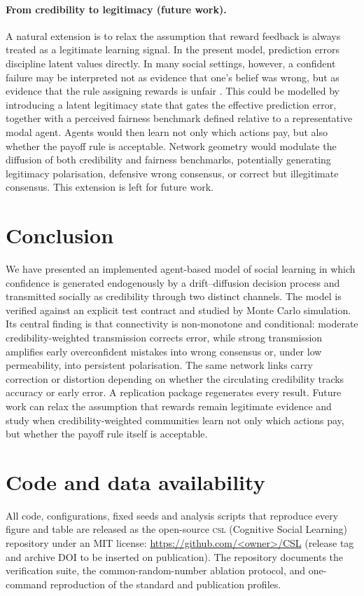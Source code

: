 \documentclass[11pt]{article}
\newcommand{\1}{\mathbf{1}}
\begin{document}
\paragraph{From credibility to legitimacy (future work).}
A natural extension is to relax the assumption that reward feedback is always
treated as a legitimate learning signal. In the present model, prediction errors
discipline latent values directly. In many social settings, however, a confident
failure may be interpreted not as evidence that one's belief was wrong, but as
evidence that the rule assigning rewards is unfair
\citep{Rabin1993Fairness,FehrSchmidt1999,BoltonOckenfels2000}. This could be
modelled by introducing a latent legitimacy state that gates the effective
prediction error, together with a perceived fairness benchmark defined relative
to a representative modal agent. Agents would then learn not only which actions
pay, but also whether the payoff rule is acceptable. Network geometry would
modulate the diffusion of both credibility and fairness benchmarks, potentially
generating legitimacy polarisation, defensive wrong consensus, or correct but
illegitimate consensus. This extension is left for future work.

\section{Conclusion}
We have presented an implemented agent-based model of social learning in which
confidence is generated endogenously by a drift--diffusion decision process and
transmitted socially as credibility through two distinct channels. The model is
verified against an explicit test contract and studied by Monte Carlo
simulation. Its central finding is that connectivity is non-monotone and
conditional: moderate credibility-weighted transmission corrects error, while
strong transmission amplifies early overconfident mistakes into wrong consensus
or, under low permeability, into persistent polarisation. The same network links
carry correction or distortion depending on whether the circulating credibility
tracks accuracy or early error. A replication package regenerates every result.
Future work can relax the assumption that rewards remain legitimate evidence and
study when credibility-weighted communities learn not only which actions pay, but
whether the payoff rule itself is acceptable.

\section*{Code and data availability}
All code, configurations, fixed seeds and analysis scripts that reproduce every
figure and table are released as the open-source \textsc{csl} (Cognitive Social
Learning) repository under an MIT license:
\url{https://github.com/<owner>/CSL} (release tag and archive DOI to be inserted
on publication). The repository documents the verification suite, the
common-random-number ablation protocol, and one-command reproduction of the
standard and publication profiles.
\end{document}
